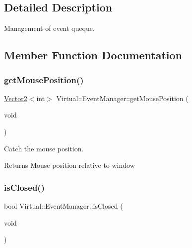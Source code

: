 \subsection{Detailed Description}
Management of event queque. 

\subsection{Member Function Documentation}
\hypertarget{class_virtual_1_1_event_manager_a3d55fffe71640c02b40788887a1048f0}{}\label{class_virtual_1_1_event_manager_a3d55fffe71640c02b40788887a1048f0} 
\subsubsection{\texorpdfstring{get\+Mouse\+Position()}{getMousePosition()}}
{\footnotesize\ttfamily \hyperlink{struct_virtual_1_1_vector2}{Vector2}$<$int$>$ Virtual\+::\+Event\+Manager\+::get\+Mouse\+Position (\begin{DoxyParamCaption}\item[{void}]{ }\end{DoxyParamCaption})}



Catch the mouse position. 

\begin{DoxyReturn}{Returns}
Mouse position relative to window 
\end{DoxyReturn}
\hypertarget{class_virtual_1_1_event_manager_ab1f3521b16ff390d968a12c9c8fbc00c}{}\label{class_virtual_1_1_event_manager_ab1f3521b16ff390d968a12c9c8fbc00c} 
\subsubsection{\texorpdfstring{is\+Closed()}{isClosed()}}
{\footnotesize\ttfamily bool Virtual\+::\+Event\+Manager\+::is\+Closed (\begin{DoxyParamCaption}\item[{void}]{ }\end{DoxyParamCaption})}



